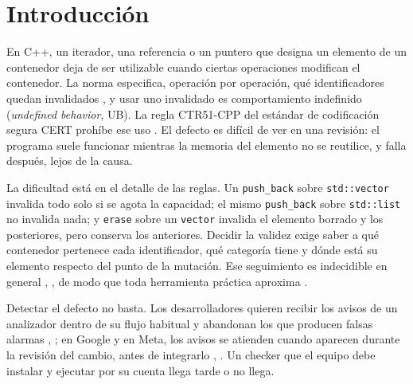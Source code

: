 \documentclass[conference]{IEEEtran}
\newcommand{\code}[1]{\texttt{#1}}
\begin{document}
\section{Introducción}

En C++, un iterador, una referencia o un puntero que designa un elemento de un contenedor deja de ser utilizable cuando ciertas operaciones modifican el contenedor. La norma especifica, operación por operación, qué identificadores quedan invalidados \cite{iso17}, y usar uno invalidado es comportamiento indefinido (\textit{undefined behavior}, UB). La regla CTR51-CPP del estándar de codificación segura CERT prohíbe ese uso \cite{cert}. El defecto es difícil de ver en una revisión: el programa suele funcionar mientras la memoria del elemento no se reutilice, y falla después, lejos de la causa.

La dificultad está en el detalle de las reglas. Un \code{push\_back} sobre \code{std::vector} invalida todo solo si se agota la capacidad; el mismo \code{push\_back} sobre \code{std::list} no invalida nada; y \code{erase} sobre un \code{vector} invalida el elemento borrado y los posteriores, pero conserva los anteriores. Decidir la validez exige saber a qué contenedor pertenece cada identificador, qué categoría tiene y dónde está su elemento respecto del punto de la mutación. Ese seguimiento es indecidible en general \cite{landi92}, \cite{ramalingam94}, de modo que toda herramienta práctica aproxima \cite{livshits15}.

Detectar el defecto no basta. Los desarrolladores quieren recibir los avisos de un analizador dentro de su flujo habitual y abandonan los que producen falsas alarmas \cite{christakis16}, \cite{guo23}; en Google y en Meta, los avisos se atienden cuando aparecen durante la revisión del cambio, antes de integrarlo \cite{sadowski18}, \cite{distefano19}. Un checker que el equipo debe instalar y ejecutar por su cuenta llega tarde o no llega.
\end{document}
